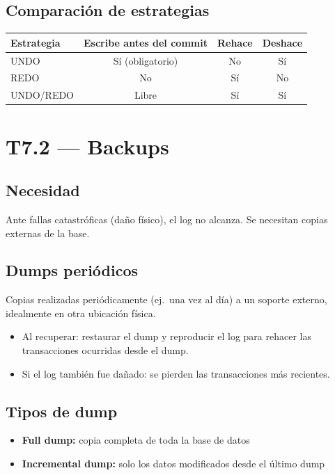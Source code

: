 \documentclass[12pt, a4paper]{article}
\begin{document}
\subsection{Comparación de estrategias}

\begin{tabularx}{\textwidth}{Xccc}
\toprule
\textbf{Estrategia} & \textbf{Escribe antes del commit} & \textbf{Rehace} & \textbf{Deshace} \\
\midrule
UNDO      & Sí (obligatorio) & No  & Sí \\
REDO      & No               & Sí  & No \\
UNDO/REDO & Libre            & Sí  & Sí \\
\bottomrule
\end{tabularx}

\section{T7.2 — Backups}

\subsection{Necesidad}
Ante fallas catastróficas (daño físico), el log no alcanza. Se necesitan copias externas de la base.

\subsection{Dumps periódicos}
Copias realizadas periódicamente (ej.\ una vez al día) a un soporte externo, idealmente en otra ubicación física.
\begin{itemize}
  \item Al recuperar: restaurar el dump y reproducir el log para rehacer las transacciones ocurridas desde el dump.
  \item Si el log también fue dañado: se pierden las transacciones más recientes.
\end{itemize}

\subsection{Tipos de dump}
\begin{itemize}
  \item \textbf{Full dump:} copia completa de toda la base de datos
  \item \textbf{Incremental dump:} solo los datos modificados desde el último dump
\end{itemize}
\end{document}
